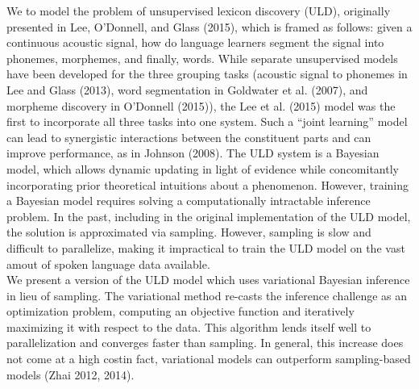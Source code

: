 \documentclass[12pt,letterpaper]{article}
\newcommand\tab[1][1cm]{\hspace*{#1}}
\newif\ifcomments
\newcommand{\cm}[1]{\textcolor{purple}{\ifcomments[COMMENT: #1]\else\fi}}
\begin{document}
\tab \cm{tabs unnecessary in abstract} We  to model the problem of unsupervised lexicon discovery (ULD), originally presented in Lee, O'Donnell, and Glass (2015), which is framed as follows: given a continuous acoustic signal, how do language learners segment the signal into phonemes, morphemes, and finally, words.\cm{this is a bit convoluted ``we attempt to model the problem..'' LOG is a model, not a problem. The problem is learning units at multiple grain sizes (phones, morphemes, etc.) directly from the acoustic input. You should get to that at the end of the first paragraph and then in the beginning here basically say ``a state of the art model of this is LOG''...}
 While separate unsupervised models have been developed for the three grouping tasks (acoustic signal to phonemes in Lee and Glass (2013), word segmentation in Goldwater et al. (2007)\cm{I wouldn't introduce this in a ``while'' clause---it sounds apologetic and deflationary. Just say we were the first to jointly model these earlier tasks. }, and morpheme discovery in O'Donnell (2015)), the Lee et al. (2015) model was the first to incorporate all three tasks into one system. Such a ``joint learning'' model can lead to synergistic interactions between the constituent parts and can improve performance, as in Johnson (2008).\cm{no ``as in'' just the citation.} The ULD system is a Bayesian model, which allows  dynamic updating in light of evidence while concomitantly incorporating prior theoretical intuitions about a phenomenon.\cm{preceding sentence is redundant. Just say that LOG introduce a bayesian joint model of these various earlier efforts.} However, training a Bayesian model requires solving a computationally intractable inference problem.\cm{relative preceding statement to \emph{this} model---not all bayesian models are intractable (though almost all are)---e.g., a simple gaussian with conjugate priors.} In the past, including in the original implementation of the ULD model, the solution is approximated via sampling.\cm{slightly incorrect jargon---say that inference was implemented using sampling-based approaches} However, sampling is slow and difficult to parallelize, making it impractical to train the ULD model on the vast amout of spoken language data available. \\
\tab We present a version of the ULD model which uses variational Bayesian inference in lieu of sampling. The variational method re-casts the inference challenge as an optimization problem, computing an objective function and iteratively maximizing it with respect to the data. This algorithm lends itself well to parallelization and converges faster than sampling. In general, this increase does not come at a high cost\textemdash in fact, variational models can outperform sampling-based models (Zhai 2012, 2014).\cm{This last aside is a bit too vague---what do you mean that they can outperform, what cost was implied in the beginning.}\\
\end{document}
